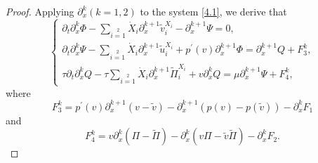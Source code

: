 \documentclass[10pt,reqno]{amsart}
\numberwithin{equation}{section}
\begin{document}
\begin{proof}
Applying $\partial^k_x(k=1,2)$ to the system \eqref{4.1}, we derive that
\begin{equation}\label{4.10}
\begin{cases}
\partial_{t}\partial_{x}^k\Phi
-\sum\limits_{i=1}\limits^2\dot{X}_i\partial_{x}^{k+1}\widetilde{v}_i^{X_i}-\partial_{x}^{k+1}\Psi=0,\\
\partial_{t}\partial_{x}^k\Psi
-\sum\limits_{i=1}\limits^2\dot{X}_i\partial_{x}^{k+1}\widetilde{u}_i^{X_i}
          +p^{\prime}(v)\partial_{x}^{k+1}\Phi=\partial_{x}^{k+1}Q+F_3^k,\\
\tau\partial_{t}\partial_{x}^kQ
-\tau\sum\limits_{i=1}\limits^2\dot{X}_i\partial_{x}^{k+1}\widetilde{\Pi}_i^{X_i}
             +v\partial_{x}^{k}Q=\mu\partial_{x}^{k+1}\Psi+F_4^k,
\end{cases}
\end{equation}
where $$F_3^k=p^{\prime}(v)\partial^{k+1}_{x}(v-\widetilde{v})-\partial^{k+1}_{x}(p(v)-p(\widetilde{v}))
-\partial^k_{x}F_1$$
and
$$F_4^k=v\partial^k_{x}(\Pi-\widetilde{\Pi})-\partial^k_{x}(v\Pi-\widetilde{v}\widetilde{\Pi})
-\partial^k_{x}F_2.$$


\end{proof}
\end{document}
